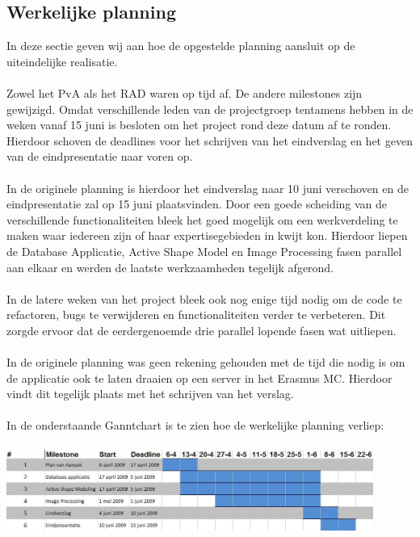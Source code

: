 \subsection{Werkelijke planning}
\label{werkelijke_planning}
In deze sectie geven wij aan hoe de opgestelde planning aansluit op de
uiteindelijke realisatie.
\\
\\
Zowel het PvA als het RAD waren op tijd af. De andere milestones zijn
gewijzigd. Omdat verschillende leden van de projectgroep tentamens
hebben in de weken vanaf 15 juni is besloten om het project rond deze datum af
te ronden. Hierdoor schoven de deadlines voor het schrijven van het eindverslag
en het geven van de eindpresentatie naar voren op.
\\
\\
In de originele planning is hierdoor het eindverslag naar 10 juni verschoven en de eindpresentatie zal op 15 juni plaatsvinden.  Door een goede scheiding van de
verschillende functionaliteiten bleek het goed mogelijk om een werkverdeling te
maken waar iedereen zijn of haar expertisegebieden in kwijt kon. Hierdoor
liepen de Database Applicatie, Active Shape Model en Image Processing fasen
parallel aan elkaar en werden de laatste werkzaamheden tegelijk afgerond.
\\
\\
In de latere weken van het project bleek ook nog enige tijd nodig om de code te
refactoren, bugs te verwijderen en functionaliteiten verder te verbeteren. Dit
zorgde ervoor dat de eerdergenoemde drie parallel lopende fasen wat uitliepen.
\\
\\
In de originele planning was geen rekening gehouden met de tijd die nodig is om
de applicatie ook te laten draaien op een server in het Erasmus MC. Hierdoor
vindt dit tegelijk plaats met het schrijven van het verslag.
\\
\\
In de onderstaande Ganntchart is te zien hoe de werkelijke planning verliep:
\\
\\
\includegraphics[width=0.9\textwidth]{ganntafter}
